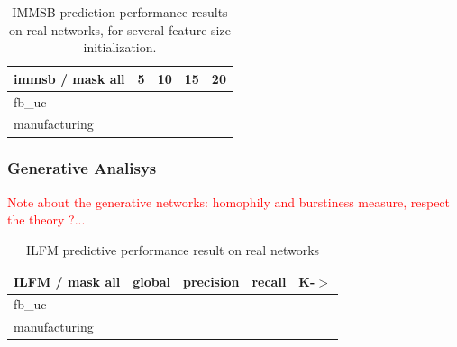 
\begin{table} \label{table:real1}
    \caption{IMMSB prediction performance results on real networks, for several feature size initialization.}
\begin{tabular}{lrrrr}
\hline                                                                             
 immsb / mask all   &        5 &       10 &       15 &       20 \\                 
\hline                                                                             
fb\_uc & & & & \\
manufacturing  & & & & \\
\hline                                                                             
\end{tabular}  
\end{table}

\subsubsection{Generative Analisys}

\textcolor{red}{Note about the generative networks: homophily and burstiness measure, respect the theory ?...}
 

\begin{table} \label{table:real2}
    \caption{ILFM predictive performance result on real networks}
\begin{tabular}{lrrrr}
\hline
 ILFM / mask all   &     global &   precision &      recall &   K-\ensuremath{>} \\
\hline
fb\_uc& & & & \\
manufacturing  & & & & \\
\hline
\end{tabular}  
\end{table}

